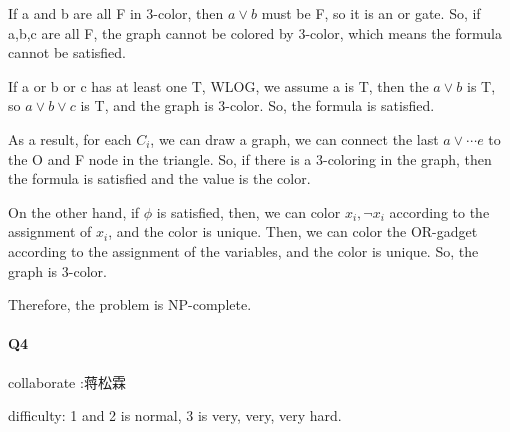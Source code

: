 \documentclass[UTF8]{ctexart}
\renewcommand{\(}{\left(}
\renewcommand{\)}{\right)}
\begin{document}
If a and b are all F in 3-color, then $a \vee  b$ must be F, so it is an or gate. So, if a,b,c are all F, the graph cannot be colored by 3-color, 
which means the formula cannot be satisfied. 

If a or b or c has at least one T, WLOG, we assume a is T, then the $a \vee b$ is T, so $a \vee b \vee c$
is T, and the graph is 3-color. So, the formula is satisfied.

As a result, for each $C_{i}$, we can draw a graph, we can connect the last $a \vee \cdots e$ to the O and F node in the triangle.
So, if there is a 3-coloring in the graph, then the formula is satisfied and the value is the color.

On the other hand, if $\phi$ is satisfied, then, we can color  ${x_{i}, \neg x_{i}}$ according to the assignment of $x_{i}$, and the color is unique.
Then, we can color the OR-gadget according to the assignment of the variables, and the color is unique. So, the graph is 3-color.

Therefore, the problem is NP-complete.

\paragraph{Q4}

collaborate :蒋松霖

difficulty: 1 and 2 is normal, 3 is very, very, very hard.
\end{document}

